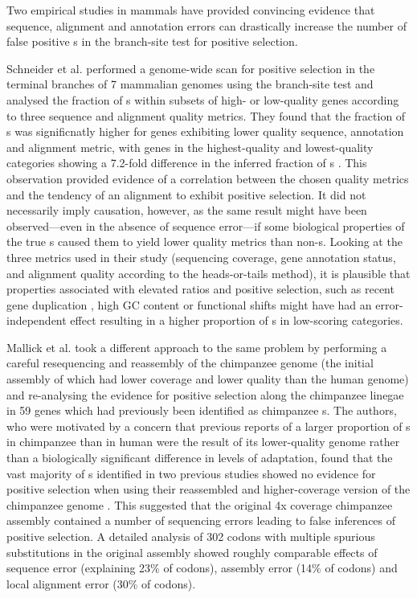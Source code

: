 Two empirical studies in mammals have provided convincing evidence
that sequence, alignment and annotation errors can drastically
increase the number of false positive \psg{}s in the branch-site test
for positive selection.

Schneider et al. \citeyearpar{Schneider2009} performed a genome-wide
scan for positive selection in the terminal branches of 7 mammalian
genomes using the branch-site test and analysed the fraction of
\psg{}s within subsets of high- or low-quality genes according to
three sequence and alignment quality metrics. They found that the
fraction of \psg{}s was significnatly higher for genes exhibiting
lower quality sequence, annotation and alignment metric, with genes in
the highest-quality and lowest-quality categories showing a 7.2-fold
difference in the inferred fraction of \psg{}s
\citep{Schneider2009}. This observation provided evidence of a
correlation between the chosen quality metrics and the tendency of an
alignment to exhibit positive selection. It did not necessarily imply
causation, however, as the same result might have been observed---even
in the absence of sequence error---if some biological properties of
the true \psg{}s caused them to yield lower quality metrics than
non-\psg{}s. Looking at the three metrics used in their study
(sequencing coverage, gene annotation status, and alignment quality
according to the heads-or-tails method), it is plausible that
properties associated with elevated \omg ratios and positive
selection, such as recent gene duplication
\citep{Beisswanger2008,Studer2008,Casola2009}, high GC content
\citep{Ratnakumar2010} or functional shifts \citep{Storz2008,Wang2001}
might have had an error-independent effect resulting in a higher
proportion of \psg{}s in low-scoring categories.

Mallick et al. \citeyearpar{Mallick2009} took a different
approach to the same problem by performing a careful resequencing and
reassembly of the chimpanzee genome (the initial assembly of which had
lower coverage and lower quality than the human genome) and
re-analysing the evidence for positive selection along the chimpanzee
linegae in 59 genes which had previously been identified as chimpanzee
\psg{}s. The authors, who were motivated by a concern that previous
reports of a larger proportion of \psg{}s in chimpanzee than in human
\citep{Bakewell2007} were the result of its lower-quality genome rather than a
biologically significant difference in levels of adaptation, found
that the vast majority of \psg{}s identified in two previous studies
showed no evidence for positive selection when using their reassembled
and higher-coverage version of the chimpanzee genome
\citep{Mallick2009}. This suggested that the original 4x
coverage chimpanzee assembly contained a number of sequencing errors
leading to false inferences of positive selection. A detailed analysis
of 302 codons with multiple spurious \nsyn substitutions in the
original assembly showed roughly comparable effects of sequence error
(explaining 23\% of codons), assembly error (14\% of codons) and local
alignment error (30\% of codons).

